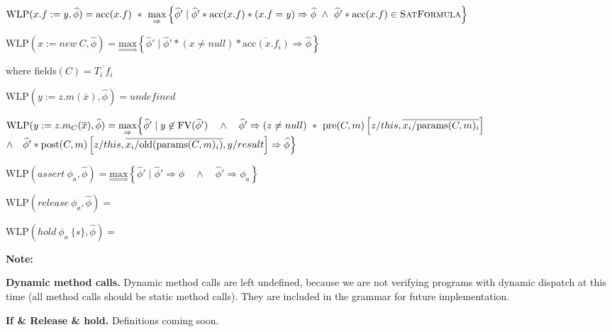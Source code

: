 \documentclass {article}
\newcommand{\fphi}{\widehat{\phi}}
\newcommand{\acc}[1]{\text{acc}(#1)}
\newcommand{\imp}{\Rightarrow}
\newcommand{\maximp}[2]{\underset{\Rightarrow}{\text{max}}\left\{#1 \mid #2\right\}}
\newcommand{\wlp}[2]{\text{WLP}(#1,#2)}
\newcommand{\satdef}{\textsc{SatFormula}}
\begin{document}
$\wlp{x.f := y}{\fphi} = \acc{x.f} \ \ast \ \maximp{\fphi'}{\fphi' \ast \acc{x.f} \ast (x.f = y) \imp \fphi \ \wedge \ \fphi' * \acc{x.f} \in \satdef} $

\vspace{0.5cm}

$\wlp{x := new\ C}{\fphi} = \maximp{\fphi'}{ \fphi' \ast (x \neq null) \ast \overline{\acc{x.f_i}} \imp \fphi}$


\indent  \hspace{4cm} where fields$(C) = \overline{T_i \ f_i}$

\vspace{0.5cm}

$\wlp{y := z.m(\overline{x})}{\fphi} = undefined$

\vspace{0.5cm}

$\wlp{y := z.m_C(\overline{x})}{\fphi} = \underset{\Rightarrow}{\text{max}} \Big{\{} \fphi' \mid y \not \in \text{FV}(\fphi') \quad \wedge \quad \fphi' \imp (z \neq null) \ \ast \ \text{pre}(C,m)\left[z/this, \overline{x_i/\text{params}(C,m)_i}\right] $ 
\indent \hspace{4cm} $ \wedge \quad \fphi' \ast \text{post}(C,m)\left[z/this, \overline{x_i/\text{old}(\text{params}(C,m)_i)}, y/result \right] \imp \fphi \Big{\}}$

\vspace{0.5cm}

$\wlp{assert\ \phi_a}{\fphi} = \maximp{\fphi'}{\fphi' \imp \fphi \quad \wedge \quad \fphi' \imp \phi_a} $

\vspace{0.5cm}

$\wlp{release \ \phi_a}{\fphi} = $

\vspace{0.5cm}

$\wlp{hold \ \phi_a \ \{s\}}{\fphi} = $

\vspace{0.5cm}

\noindent \textbf{Note:} 

\textbf{Dynamic method calls.} Dynamic method calls are left undefined, because we are not verifying programs with dynamic dispatch at this time (all method calls should be static method calls). They are included in the grammar for future implementation.

\textbf{If \& Release \& hold.} Definitions coming soon.
\end{document}
